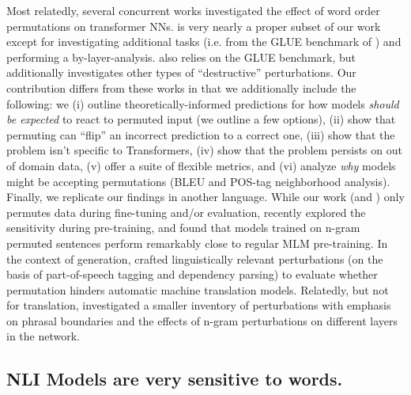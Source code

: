 \documentclass[letterpaper, 12pt]{report}
\begin{document}
Most relatedly, several concurrent works \citep{pham-etal-2020-out, alleman2021syntactic, gupta-etal-2021-bert, sinha2021masked,parthasarathi2021sometimes} investigated the effect of word order permutations on transformer NNs.  \cite{pham-etal-2020-out} is very nearly a proper subset of our work except for investigating additional tasks (i.e. from the GLUE benchmark of \citealt{wang-etal-2018-glue}) and performing a by-layer-analysis. \cite{gupta-etal-2021-bert} also relies on the GLUE benchmark, but additionally investigates other types of ``destructive'' perturbations. Our contribution differs from these works %
in that we additionally include the following: we (i) outline theoretically-informed predictions for how models \emph{should be expected} to react to permuted input (we outline a few options), (ii) show that permuting can ``flip'' an incorrect prediction to a correct one, (iii) show that the problem isn't specific to Transformers, (iv) show that the problem persists on out of domain data, (v) offer a suite of flexible metrics, and (vi) analyze \emph{why} models might be accepting permutations (BLEU and POS-tag neighborhood analysis). Finally, we replicate our findings in another language.
While our work (and \citeauthor{pham-etal-2020-out,gupta-etal-2021-bert}) only permutes data during fine-tuning and/or evaluation,
recently \citeauthor{sinha2021masked} explored the sensitivity during pre-training, and found that models trained on n-gram permuted sentences perform remarkably close to regular MLM pre-training.
In the context of generation, \cite{parthasarathi2021sometimes} crafted linguistically relevant perturbations (on the basis of part-of-speech tagging and dependency parsing) to evaluate whether permutation hinders automatic machine translation models. Relatedly, but not for translation, \cite{alleman2021syntactic} investigated a smaller inventory of perturbations with emphasis on phrasal boundaries and the effects of n-gram perturbations on different layers in the network. %


\subsection{NLI Models are very sensitive to words.}
\end{document}
